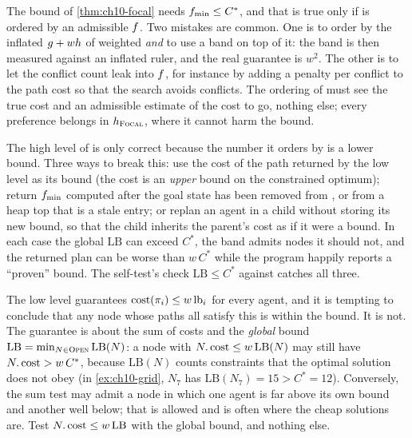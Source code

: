 \begin{pitfall}
The bound of \cref{thm:ch10-focal} needs $f_{\min} \le C^*$, and that
is true only if \Open is ordered by an admissible $f$. Two mistakes are
common. One is to order \Open by the inflated $g + wh$ of weighted
\astar \emph{and} to use a band on top of it: the band is then measured
against an inflated ruler, and the real guarantee is $w^2$. The other is to
let the conflict count leak into $f$, for instance by adding a penalty
per conflict to the path cost so that the search avoids conflicts. The
ordering of \Open must see the true cost and an admissible estimate of the
cost to go, nothing else; every preference belongs in $h_{\textsc{Focal}}$,
where it cannot harm the bound.
\end{pitfall}

\begin{pitfall}
The high level of \ecbs is only correct because the number it orders \Open by
is a lower bound. Three ways to break this: use the cost of the path returned
by the low level as its bound (the cost is an \emph{upper} bound on the
constrained optimum); return $f_{\min}$ computed after the goal state
has been removed from \Open, or from a heap top that is a stale entry; or
replan an agent in a child without storing its new bound, so that the child
inherits the parent's cost as if it were a bound. In each case the global
$\mathrm{LB}$ can exceed $C^*$, the band admits nodes it should not, and the
returned plan can be worse than $w\,C^*$ while the program happily reports a
``proven'' bound. The self-test's check $\mathrm{LB} \le C^*$ against \cbs
catches all three.
\end{pitfall}

\begin{pitfall}
The low level guarantees $\operatorname{cost}(\pi_i) \le w\,\mathrm{lb}_i$ for every
agent, and it is tempting to conclude that any node whose paths all satisfy
this is within the bound. It is not. The guarantee is about the sum of costs
and the \emph{global} bound $\mathrm{LB} = \min_{N \in \textsc{Open}} \mathrm{LB}(N)$:
a node with $N.\operatorname{cost} \le w\,\mathrm{LB}(N)$ may still have $N.\operatorname{cost} >
w\,C^*$, because $\mathrm{LB}(N)$ counts constraints that the optimal
solution does not obey (in \cref{ex:ch10-grid}, $N_7$ has $\mathrm{LB}(N_7)
= 15 > C^* = 12$). Conversely, the sum test may admit a node in which one
agent is far above its own bound and another well below; that is allowed and
is often where the cheap solutions are. Test $N.\operatorname{cost} \le w\,\mathrm{LB}$
with the global bound, and nothing else.
\end{pitfall}

